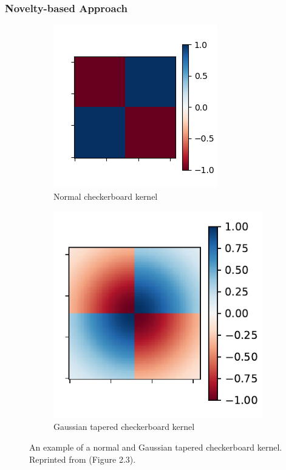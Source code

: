\subsubsection{Novelty-based Approach}
\begin{figure}[t]
    \centering
    \begin{subfigure}{.5\textwidth}
        \centering
        \includegraphics{images/checkerboard}
        \caption{Normal checkerboard kernel}
        \label{pw:fig:foote:norm}
    \end{subfigure}%
    \begin{subfigure}{.5\textwidth}
        \centering
        \includegraphics{images/gaussian_checkerboard}
        \caption{Gaussian tapered checkerboard kernel}
        \label{pw:fig:foote:gaus}
    \end{subfigure}
    \caption{An example of a normal and Gaussian tapered checkerboard kernel.\\
    Reprinted from \textcite{Jesperthesis} (Figure 2.3).}
    \label{fig:checkerboard}
\end{figure}
